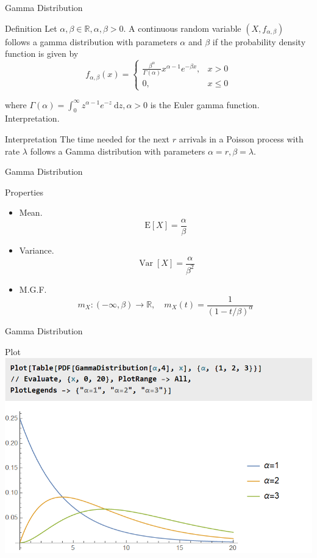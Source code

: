 \documentclass{beamer}
\begin{document}
\begin{frame}{Gamma Distribution}
\begin{block}{Definition}
Let $\alpha, \beta \in \mathbb{R}, \alpha, \beta>0$. A continuous random variable $\left(X, f_{\alpha, \beta}\right)$ follows a gamma distribution with parameters $\alpha$ and $\beta$ if the probability density function is given by
$$
f_{\alpha, \beta}(x)= \begin{cases}\frac{\beta^{\alpha}}{\Gamma(\alpha)} x^{\alpha-1} e^{-\beta x}, & x>0 \\ 0, & x \leq 0\end{cases}
$$
\end{block}
where $\Gamma(\alpha)=\int_{0}^{\infty} z^{\alpha-1} e^{-z} \mathrm{~d} z, \alpha>0$ is the Euler gamma function.
Interpretation. 
\begin{block}{Interpretation}
The time needed for the next $r$ arrivals in a Poisson process with rate $\lambda$ follows a Gamma distribution with parameters $\alpha=r, \beta=\lambda$.
\end{block}
\end{frame}

\begin{frame}{Gamma Distribution}
\begin{block}{Properties}
\begin{itemize}
\item Mean.
$$
\mathrm{E}[X]=\frac{\alpha}{\beta}
$$
\item Variance. 
$$
\operatorname{Var}[X]=\frac{\alpha}{\beta^{2}}
$$
\item M.G.F.
$$
m_{X}:(-\infty, \beta) \rightarrow \mathbb{R}, \quad m_{X}(t)=\frac{1}{(1-t / \beta)^{\alpha}}
$$
\end{itemize}
\end{block}
\end{frame}


\begin{frame}{Gamma Distribution}
\begin{block}{Plot}
\includegraphics[scale=0.5]{gamma1.png}
\end{block}
\end{frame}
\end{document}
